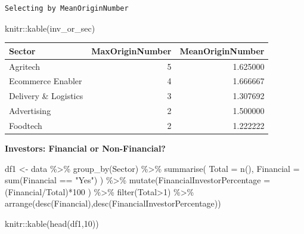 \documentclass[
  letterpaper,
  DIV=11,
  numbers=noendperiod]{scrreprt}
\newenvironment{Shaded}{\begin{snugshade}}{\end{snugshade}}
\newcommand{\AttributeTok}[1]{\textcolor[rgb]{0.40,0.45,0.13}{#1}}
\newcommand{\DecValTok}[1]{\textcolor[rgb]{0.68,0.00,0.00}{#1}}
\newcommand{\FunctionTok}[1]{\textcolor[rgb]{0.28,0.35,0.67}{#1}}
\newcommand{\NormalTok}[1]{\textcolor[rgb]{0.00,0.23,0.31}{#1}}
\newcommand{\OtherTok}[1]{\textcolor[rgb]{0.00,0.23,0.31}{#1}}
\newcommand{\SpecialCharTok}[1]{\textcolor[rgb]{0.37,0.37,0.37}{#1}}
\newcommand{\StringTok}[1]{\textcolor[rgb]{0.13,0.47,0.30}{#1}}
\begin{document}
\begin{verbatim}
Selecting by MeanOriginNumber
\end{verbatim}

\begin{Shaded}
\begin{Highlighting}[]
\NormalTok{knitr}\SpecialCharTok{::}\FunctionTok{kable}\NormalTok{(inv\_or\_sec)}
\end{Highlighting}
\end{Shaded}

\begin{longtable}[]{@{}lrr@{}}
\toprule()
Sector & MaxOriginNumber & MeanOriginNumber \\
\midrule()
\endhead
Agritech & 5 & 1.625000 \\
Ecommerce Enabler & 4 & 1.666667 \\
Delivery \& Logistics & 3 & 1.307692 \\
Advertising & 2 & 1.500000 \\
Foodtech & 2 & 1.222222 \\
\bottomrule()
\end{longtable}

\textbf{Investors: Financial or Non-Financial?}

\begin{Shaded}
\begin{Highlighting}[]
\NormalTok{df1 }\OtherTok{\textless{}{-}}\NormalTok{ data }\SpecialCharTok{\%\textgreater{}\%}
  \FunctionTok{group\_by}\NormalTok{(Sector) }\SpecialCharTok{\%\textgreater{}\%}
  \FunctionTok{summarise}\NormalTok{(}
    \AttributeTok{Total =} \FunctionTok{n}\NormalTok{(),}
    \AttributeTok{Financial =} \FunctionTok{sum}\NormalTok{(Financial }\SpecialCharTok{==} \StringTok{"Yes"}\NormalTok{)}
\NormalTok{  ) }\SpecialCharTok{\%\textgreater{}\%}
  \FunctionTok{mutate}\NormalTok{(}\AttributeTok{FinancialInvestorPercentage =}\NormalTok{(Financial}\SpecialCharTok{/}\NormalTok{Total)}\SpecialCharTok{*}\DecValTok{100}\NormalTok{ ) }\SpecialCharTok{\%\textgreater{}\%}
  \FunctionTok{filter}\NormalTok{(Total}\SpecialCharTok{\textgreater{}}\DecValTok{1}\NormalTok{) }\SpecialCharTok{\%\textgreater{}\%}
  \FunctionTok{arrange}\NormalTok{(}\FunctionTok{desc}\NormalTok{(Financial),}\FunctionTok{desc}\NormalTok{(FinancialInvestorPercentage))}

\NormalTok{knitr}\SpecialCharTok{::}\FunctionTok{kable}\NormalTok{(}\FunctionTok{head}\NormalTok{(df1,}\DecValTok{10}\NormalTok{))}
\end{Highlighting}
\end{Shaded}
\end{document}
